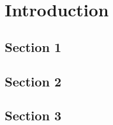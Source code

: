 \documentclass[class=custom,crop=false]{standalone}
\begin{document}
\chapter{Introduction}

\section{Section 1}

\lipsum[1-2]

\section{Section 2}

\lipsum[3-6]

\section{Section 3}

\lipsum[4-8]
\end{document}
